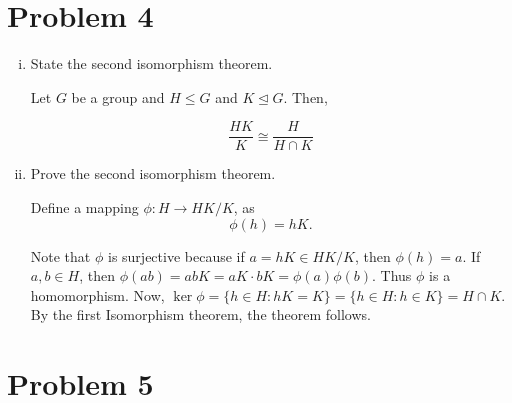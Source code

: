 \documentclass[12pt]{article}
\begin{document}
\section*{Problem 4}
\begin{enumerate}[(i)]
    \item State the second isomorphism theorem.

    Let $G$ be a group and $H \leq G$ and $K \unlhd G$. Then, 

    $$\dfrac{HK}{K} \cong \dfrac{H}{H \cap K}$$

    \item Prove the second isomorphism theorem.

    Define a mapping $\phi: H \to HK/K$, as 
    $$\phi(h) = hK.$$

    Note that $\phi$ is surjective because if $a = hK \in HK/K$, then $\phi(h) = a.$ If $a, b \in H$, then $\phi(ab) = abK = aK\cdot bK = \phi(a)\phi(b)$. Thus $\phi$ is a homomorphism. Now, 
    $\ker \phi = \{h \in H: hK = K\} = \{h \in H: h \in K\} = H \cap K$. By the first Isomorphism theorem, the theorem follows.
    \end{enumerate}

    \section*{Problem 5}
\end{document}
